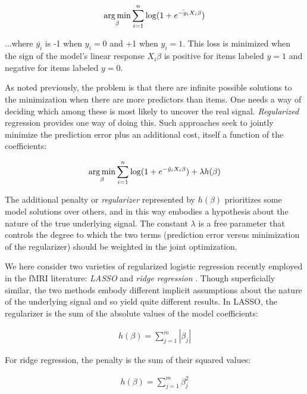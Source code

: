 \begin{align}
\operatorname*{arg\,min}_\beta \sum^{n}_{i=1}{\log(1 + e^{\bar{-y_i} X_i\beta})}
\label{eq.logisticopt}
\end{align}

...where $\bar{y_i}$ is -1 when $y_i=0$ and +1 when $y_i=1$. This loss is minimized when the sign of the model's linear response $X_i\beta$ is positive for items labeled $y=1$ and negative for items labeled $y=0$.

As noted previously, the problem is that there are infinite possible solutions to the minimization when there are more predictors than items. One needs a way of deciding which among these is most likely to uncover the real signal. {\em Regularized} regression provides one way of doing this. Such approaches seek to jointly minimize the prediction error plus an additional cost, itself a function of the coefficients:

\begin{align}
\operatorname*{arg\,min}_\beta \sum^{n}_{i=1}{\log(1 + e^{-\bar{y}_i X_i\beta})} + \lambda h(\beta)
\label{eq.regularized}
\end{align}

The additional penalty or {\em regularizer} represented by $h(\beta)$ prioritizes some model solutions over others, and in this way embodies a hypothesis about the nature of the true underlying signal. The constant $\lambda$ is a free parameter that controls the degree to which the two terms (prediction error versus minimization of the regularizer) should be weighted in the joint optimization.

We here consider two varieties of regularized logistic regression recently employed in the fMRI literature: {\em LASSO} \cite{rish_sparse_2012} and {\em ridge regression} \cite{riggall_relationship_2012}. Though superficially similar, the two methods embody different implicit assumptions about the nature of the underlying signal and so yield quite different results. In LASSO, the regularizer is the sum of the absolute values of the model coefficients:

\begin{align}
h(\beta) = \sum^m_{j=1} |\beta_j|
\label{eq.lasso}
\end{align}

For ridge regression, the penalty is the sum of their squared values:

\begin{align}
h(\beta) = \sum^m_{j=1}\beta_j^2
\label{eq.ridge}
\end{align}

